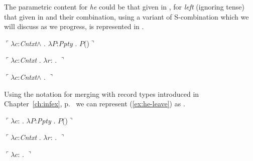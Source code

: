 The parametric content for
\textit{he} could be that given in , for \textit{left}
(ignoring tense) that given in  and their combination, using a variant
of S-combination which we will discuss as we progress, is represented
in .
\begin{ex} 
\begin{subex} 
 
\item $\ulcorner\lambda c$:\textit{Cntxt}\d{$\wedge$} . 
        $\lambda P$:\textit{Ppty} . $P$()$\urcorner$
 
\item $\ulcorner\lambda c$:\textit{Cntxt} . 
        $\lambda r$: . 
              $\urcorner$

            \item $\ulcorner\lambda c$:\textit{Cntxt}\d{$\wedge$}
  . 
         $\urcorner$
 
\end{subex} 
\label{ex:he-leave}   
\end{ex}
Using the notation for merging with record types introduced in
Chapter~\ref{ch:infex}, p.~\pageref{ex:merge-abbrev} we can represent (\ref{ex:he-leave}) as
\nexteg{}.
\begin{ex} 
\begin{subex} 
 
\item $\ulcorner\lambda c$: . 
        $\lambda P$:\textit{Ppty} . $P$()$\urcorner$
 
\item $\ulcorner\lambda c$:\textit{Cntxt} . 
        $\lambda r$: . 
              $\urcorner$

            \item $\ulcorner\lambda c$:
  . 
         $\urcorner$
 
\end{subex} 

\end{ex}


